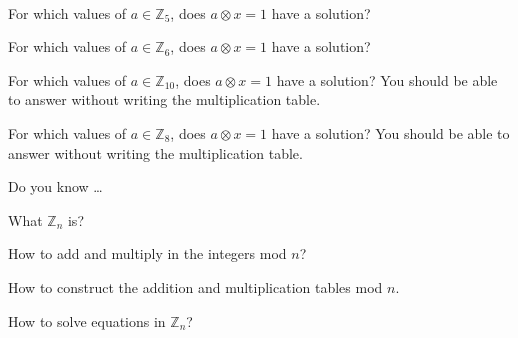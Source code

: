 \begin{exer}[\exerU] %
\label{exer_modn_units_examples}
~
    \begin{exerpart}
        \item  For which values of $a \in \mathbb{Z}_5$, does $a \otimes x = 1$ have a solution?  
        \item For which values of $a \in \mathbb{Z}_6$, does $a \otimes x = 1$ have a solution? 
        \item For which values of $a \in \mathbb{Z}_{10}$, does $a \otimes x = 1$ have a solution?  You should be able to answer without writing the multiplication table.
        \item For which values of $a \in \mathbb{Z}_8$, does $a \otimes x = 1$ have a solution?  You should be able to answer without writing the multiplication table.
    \end{exerpart}
\end{exer}

\begin{exer}[\exerR] %
\label{exer_dyk_integers_modn}
    Do you know \ldots
        \begin{exerpart}
            \item What $\mathbb{Z}_n$ is?
            \item How to add and multiply in the integers mod $n$?
            \item How to construct the addition and multiplication tables mod $n$.
            \item How to solve equations in $\mathbb{Z}_n$? 
        \end{exerpart}
\end{exer}

